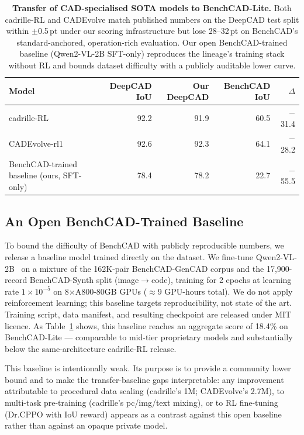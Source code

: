 \documentclass{article}
\begin{document}
\begin{table}[t]
\centering
\small
\caption{\textbf{Transfer of CAD-specialised SOTA models to BenchCAD-Lite.} Both cadrille-RL and CADEvolve match published numbers on the DeepCAD test split within $\pm$0.5\,pt under our scoring infrastructure but lose 28--32\,pt on BenchCAD's standard-anchored, operation-rich evaluation. Our open BenchCAD-trained baseline (Qwen2-VL-2B SFT-only) reproduces the lineage's training stack without RL and bounds dataset difficulty with a publicly auditable lower curve.}
\label{tab:transfer}
\begin{tabular}{lrr|rr}
\toprule
Model & DeepCAD IoU & Our DeepCAD & BenchCAD IoU & $\Delta$ \\
\midrule
cadrille-RL~\citep{Kolodiazhnyi2026}  & 92.2 & 91.9 & 60.5 & $-$31.4 \\
CADEvolve-rl1~\citep{Elistratov2026}  & 92.6 & 92.3 & 64.1 & $-$28.2 \\
\midrule
BenchCAD-trained baseline (ours, SFT-only) & 78.4 & 78.2 & 22.7 & $-$55.5 \\
\bottomrule
\end{tabular}
\end{table}


\subsection{An Open BenchCAD-Trained Baseline}
To bound the difficulty of BenchCAD with publicly reproducible numbers, we release a baseline model trained directly on the dataset. We fine-tune Qwen2-VL-2B~\citep{Qwen2VL} on a mixture of the 162K-pair BenchCAD-GenCAD corpus and the 17{,}900-record BenchCAD-Synth split (image$\to$code), training for 2 epochs at learning rate $1\!\times\!10^{-5}$ on 8$\times$A800-80GB GPUs ($\approx$9 GPU-hours total). We do not apply reinforcement learning; this baseline targets reproducibility, not state of the art. Training script, data manifest, and resulting checkpoint are released under MIT licence. As Table~\ref{tab:transfer} shows, this baseline reaches an aggregate score of 18.4\% on BenchCAD-Lite --- comparable to mid-tier proprietary models and substantially below the same-architecture cadrille-RL release.

This baseline is intentionally weak. Its purpose is to provide a community lower bound and to make the transfer-baseline gaps interpretable: any improvement attributable to procedural data scaling (cadrille's 1M; CADEvolve's 2.7M), to multi-task pre-training (cadrille's pc/img/text mixing), or to RL fine-tuning (Dr.CPPO with IoU reward) appears as a contrast against this open baseline rather than against an opaque private model.
\end{document}
